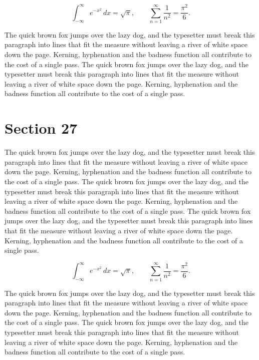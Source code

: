 \documentclass{article}
\begin{document}
\begin{equation}
\int_{-\infty}^{\infty} e^{-x^{2}}\,dx = \sqrt{\pi}, \qquad
\sum_{n=1}^{\infty} \frac{1}{n^{2}} = \frac{\pi^{2}}{6}.
\end{equation}

The quick brown fox jumps over the lazy dog, and the typesetter must break this paragraph into lines that fit the measure without leaving a river of white space down the page. Kerning, hyphenation and the badness function all contribute to the cost of a single pass. The quick brown fox jumps over the lazy dog, and the typesetter must break this paragraph into lines that fit the measure without leaving a river of white space down the page. Kerning, hyphenation and the badness function all contribute to the cost of a single pass. 
\section{Section 27}
The quick brown fox jumps over the lazy dog, and the typesetter must break this paragraph into lines that fit the measure without leaving a river of white space down the page. Kerning, hyphenation and the badness function all contribute to the cost of a single pass. The quick brown fox jumps over the lazy dog, and the typesetter must break this paragraph into lines that fit the measure without leaving a river of white space down the page. Kerning, hyphenation and the badness function all contribute to the cost of a single pass. The quick brown fox jumps over the lazy dog, and the typesetter must break this paragraph into lines that fit the measure without leaving a river of white space down the page. Kerning, hyphenation and the badness function all contribute to the cost of a single pass. 

\begin{equation}
\int_{-\infty}^{\infty} e^{-x^{2}}\,dx = \sqrt{\pi}, \qquad
\sum_{n=1}^{\infty} \frac{1}{n^{2}} = \frac{\pi^{2}}{6}.
\end{equation}

The quick brown fox jumps over the lazy dog, and the typesetter must break this paragraph into lines that fit the measure without leaving a river of white space down the page. Kerning, hyphenation and the badness function all contribute to the cost of a single pass. The quick brown fox jumps over the lazy dog, and the typesetter must break this paragraph into lines that fit the measure without leaving a river of white space down the page. Kerning, hyphenation and the badness function all contribute to the cost of a single pass. 
\end{document}
